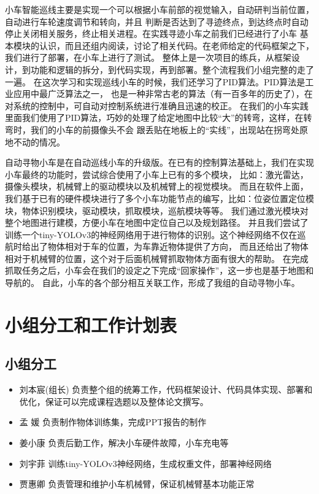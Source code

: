 \documentclass[a4paper,twoside]{article}
\begin{document}
小车智能巡线主要是实现一个可以根据小车前部的视觉输入，自动研判当前位置，自动进行车轮速度调节和转向，并且
判断是否达到了寻迹终点，到达终点时自动停止关闭相关服务，终止相关进程。在实践寻迹小车之前我们已经进行了小车
基本模块的认识，而且还组内阅读，讨论了相关代码。在老师给定的代码框架之下，我们进行了部署，在小车上进行了测试。
整体上是一次项目的练兵，从框架设计，到功能和逻辑的拆分，到代码实现，再到部署。整个流程我们小组完整的走了一遍。
在这次学习和实现巡线小车的时候，我们还学习了PID算法。PID算法是工业应用中最广泛算法之一，
也是一种非常古老的算法（有一百多年的历史了），在对系统的控制中，可自动对控制系统进行准确且迅速的校正。
在我们的小车实践里面我们使用了PID算法，巧妙的处理了给定地图中比较“大”的转弯，这样，在转弯时，我们的小车的前摄像头不会
跟丢贴在地板上的“实线”，出现站在拐弯处原地不动的情况。

自动寻物小车是在自动巡线小车的升级版。在已有的控制算法基础上，我们在实现小车最终的功能时，尝试综合使用了小车上已有的多个模块，
比如：激光雷达，摄像头模块，机械臂上的驱动模块以及机械臂上的视觉模块。
而且在软件上面，我们基于已有的硬件模块进行了多个小车功能节点的编写，比如：位姿位置定位模块，物体识别模块，驱动模块，抓取模块，巡航模块等等。
我们通过激光模块对整个地图进行建模，方便小车在地图中定位自己以及规划路径。
并且我们尝试了训练一个tiny-YOLOv3的神经网络用于进行物体的识别。这个神经网络不仅在巡航时给出了物体相对于车的位置，为车靠近物体提供了方向，
而且还给出了物体相对于机械臂的位置，这个对于后面机械臂抓取物体方面有很大的帮助。
在完成抓取任务之后，小车会在我们的设定之下完成“回家操作”，这一步也是基于地图和导航的。
自此，小车的各个部分相互关联工作，形成了我组的自动寻物小车。



\newpage
\section{小组分工和工作计划表}
\subsection{小组分工}
\begin{itemize}
	\item 刘本宸(组长) \quad
	      负责整个组的统筹工作，代码框架设计、代码具体实现、部署和优化，保证可以完成课程选题以及整体论文撰写。
	\item 孟 \quad 媛\quad
	      负责制作物体训练集，完成PPT报告的制作
	\item 姜小康 \quad
	      负责后勤工作，解决小车硬件故障，小车充电等
	\item 刘宇菲 \quad 训练tiny-YOLOv3神经网络，生成权重文件，部署神经网络
	\item 贾惠卿 \quad 负责管理和维护小车机械臂，保证机械臂基本功能正常
\end{itemize}
\end{document}
